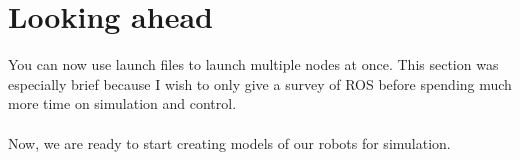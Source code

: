 \documentclass{article}
\begin{document}
    \section{Looking ahead}
        You can now use launch files to launch multiple nodes at once. This section was especially
        brief because I wish to only give a survey of ROS before spending much more time 
        on simulation and control. 
        \\
        \\
        Now, we are ready to start creating models of our robots for simulation.
\end{document}
